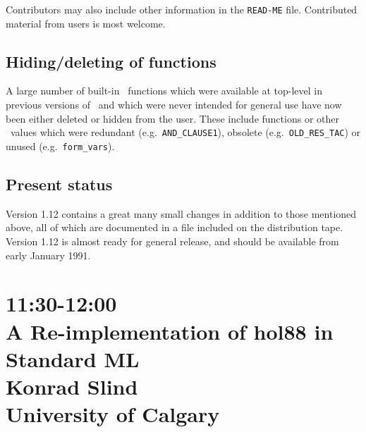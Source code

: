 \noindent Contributors may also include other information in the
\verb!READ-ME! file. Contributed material from users is most welcome.  

\subsection*{Hiding/deleting of functions}

A large number of built-in \ML\ functions which were available at top-level in
previous versions of \HOL\ and which were never intended for general use have
now been either deleted or hidden from the user.   These include functions or
other \ML\ values which were redundant (e.g.\ {\tt AND\_CLAUSE1}), obsolete
(e.g.\ {\tt OLD\_RES\_TAC}) or unused (e.g.\ {\tt form\_vars}).

\subsection*{Present status}

Version 1.12 contains a great many small changes in addition to those
mentioned above, all of which are documented in a file included on the
distribution tape. Version 1.12 is almost ready for general release, and
should be available from early January 1991.

\newpage
\section*{11:30-12:00\\
A Re-implementation of hol88 in Standard ML\\
Konrad Slind\\
\large\bf University of Calgary\\}

